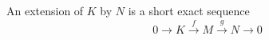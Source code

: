 An extension of $K$ by $N$ is a short exact sequence
$$0 \rightarrow K \xrightarrow{f} M \xrightarrow{g} N \rightarrow 0$$
